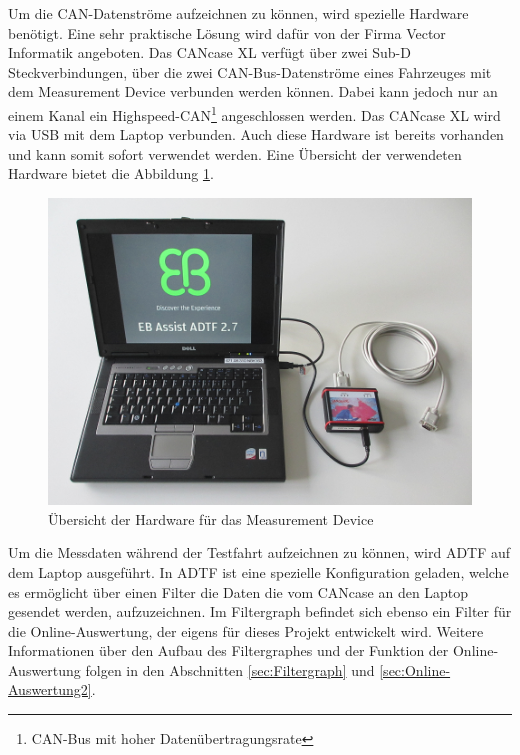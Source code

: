 \documentclass[12pt,a4paper]{report}
\begin{document}
Um die CAN-Datenströme aufzeichnen zu können, wird spezielle Hardware benötigt. Eine sehr praktische Lösung wird dafür von der Firma Vector Informatik angeboten. Das CANcase XL verfügt über zwei Sub-D Steckverbindungen, über die zwei CAN-Bus-Datenströme eines Fahrzeuges mit dem Measurement Device verbunden werden können. Dabei kann jedoch nur an einem Kanal ein Highspeed-CAN\footnote{CAN-Bus mit hoher Datenübertragungsrate} angeschlossen werden. Das CANcase XL wird via USB mit dem Laptop verbunden. Auch diese Hardware ist bereits vorhanden und kann somit sofort verwendet werden. Eine Übersicht der verwendeten Hardware bietet die Abbildung \ref{pic:Hardware}.
\begin{figure}
\includegraphics[width=1\linewidth]{Darstellungen/Hardware_neu}
\caption{Übersicht der Hardware für das Measurement Device}\label{pic:Hardware}
\end{figure}

Um die Messdaten während der Testfahrt aufzeichnen zu können, wird ADTF auf dem Laptop ausgeführt. In ADTF ist eine spezielle Konfiguration geladen, welche es ermöglicht über einen Filter die Daten die vom CANcase an den Laptop gesendet werden, aufzuzeichnen. Im Filtergraph befindet sich ebenso ein Filter für die Online-Auswertung, der eigens für dieses Projekt entwickelt wird. Weitere Informationen über den Aufbau des Filtergraphes und der Funktion der Online-Auswertung folgen in den Abschnitten \ref{sec:Filtergraph} und \ref{sec:Online-Auswertung2}.
\end{document}
